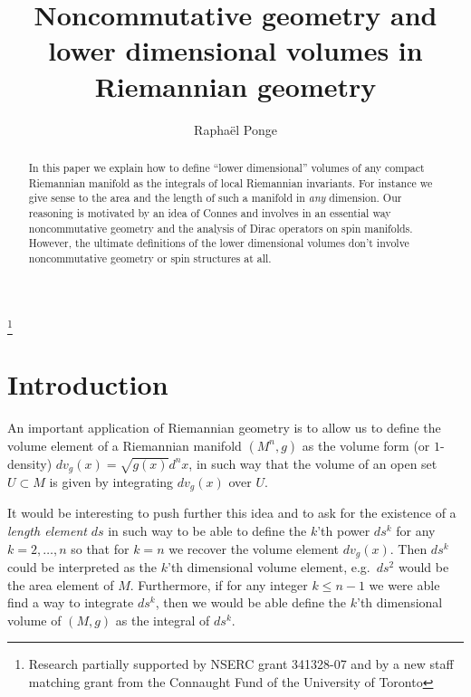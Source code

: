 \documentclass[leqno, 10pt]{amsart}
\theoremstyle{remark}
\begin{document}
\title{Noncommutative geometry and lower dimensional volumes in Riemannian geometry} 

\author{Rapha\"el Ponge}

\address{Department of Mathematics, University of Toronto, Canada.}
\thanks{Research partially supported by NSERC grant 341328-07  and 
 by a new staff matching grant from the Connaught Fund of the University of Toronto}
\begin{abstract}
 In this paper we explain how to define ``lower dimensional'' volumes of any compact Riemannian manifold as the integrals of local Riemannian 
 invariants. For instance we give sense to the area and the length of such a manifold in \emph{any} dimension.  
 Our reasoning is motivated by an idea of Connes and involves in an essential way noncommutative geometry and the analysis of Dirac operators on spin 
 manifolds. However, the ultimate definitions of the lower dimensional volumes don't involve noncommutative geometry or spin structures at all.
\end{abstract}

\maketitle 
{}

 \maketitle 
    
\section*{Introduction}
An important application of Riemannian geometry is to allow us to define the volume element of a Riemannian manifold $(M^{n},g)$ as the  
volume form (or $1$-density) $dv_{g}(x)=\sqrt{g(x)}d^{n}x$, in such way that the volume of an open set $U\subset M$ is given by integrating $dv_{g}(x)$ over $U$. 

It would be interesting to push further this idea and to ask for the existence of a \emph{length element} $ds$ in such way to be able to define the 
$k$'th power $ds^{k}$ for any $k=2,\ldots,n$ so that for $k=n$ we recover the volume element $dv_{g}(x)$. Then $ds^{k}$ could be interpreted as 
the $k$'th dimensional volume element, e.g.~$ds^{2}$ would be the area element of $M$. Furthermore, if for any integer $k\leq n-1$ we were able find 
a way to integrate $ds^{k}$,  then we would be able define the $k$'th dimensional volume of $(M,g)$ as the integral of $ds^{k}$. 
\end{document}

